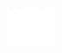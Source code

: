 \documentclass[10pt]{article}
\begin{document}
\includegraphics[max width=\textwidth, center]{2025_04_17_46e04c6acd873ea9558dg-142(1)}
\end{document}
